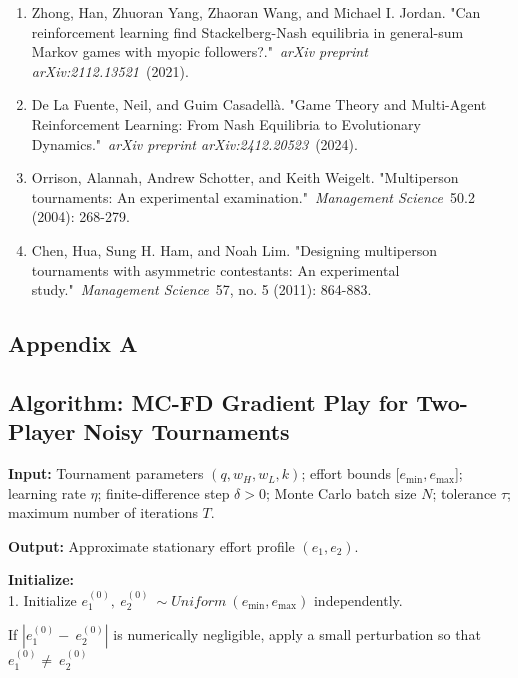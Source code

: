 \documentclass[
]{article}
\begin{document}
\begin{enumerate}
  for obtaining the Nash equilibrium of multi-player matrix
  games."~\emph{IIE Transactions}~41, no. 2 (2009): 158-167.
\item
  Zhong, Han, Zhuoran Yang, Zhaoran Wang, and Michael I. Jordan. "Can
  reinforcement learning find Stackelberg-Nash equilibria in general-sum
  Markov games with myopic followers?."~\emph{arXiv preprint
  arXiv:2112.13521}~(2021).
\item
  De La Fuente, Neil, and Guim Casadellà. "Game Theory and Multi-Agent
  Reinforcement Learning: From Nash Equilibria to Evolutionary
  Dynamics."~\emph{arXiv preprint arXiv:2412.20523}~(2024).
\item
  Orrison, Alannah, Andrew Schotter, and Keith Weigelt. "Multiperson
  tournaments: An experimental examination."~\emph{Management
  Science}~50.2 (2004): 268-279.
\item
  Chen, Hua, Sung H. Ham, and Noah Lim. "Designing multiperson
  tournaments with asymmetric contestants: An experimental
  study."~\emph{Management Science}~57, no. 5 (2011): 864-883.
\end{enumerate}

\subsection{\texorpdfstring{Appendix A }{Appendix A }}\label{appendix-a}

\subsection{\texorpdfstring{\textbf{Algorithm: MC-FD Gradient Play for
Two-Player Noisy
Tournaments}}{Algorithm: MC-FD Gradient Play for Two-Player Noisy Tournaments}}\label{algorithm-mc-fd-gradient-play-for-two-player-noisy-tournaments}

\textbf{Input:} Tournament parameters \((q,w_{H},w_{L},k)\); effort
bounds {[}\(e_{\min},e_{\max}\){]};\\
learning rate \(\eta\); finite-difference step \(\delta > 0\); Monte
Carlo batch size \(N\); tolerance \(\tau\); maximum number of iterations
\(T\).

\textbf{Output:} Approximate stationary effort profile
\((e_{1},e_{2})\).

\textbf{Initialize:}\\
1. Initialize
\(e_{1}^{(0)},\ e_{2}^{(0)}\  \sim Uniform\ \left( e_{\min},e_{\max} \right)\)
independently.

If \(\left| e_{1}^{(0)} - \ e_{2}^{(0)} \right|\) is numerically
negligible, apply a small perturbation so that
\(e_{1}^{(0)} \neq \ e_{2}^{(0)}\)
\end{document}
